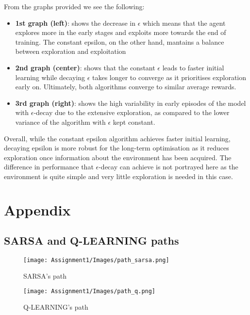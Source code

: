 \documentclass[11pt,a4paper]{article}
\begin{document}
From the graphs provided we see the following:
\begin{itemize}
    \item \textbf{1st graph (left)}: shows the decrease in $\epsilon$ which means that the agent explores more in the early stages and exploits more towards the end of training. The constant epsilon, on the other hand, mantains a balance between exploration and exploitation
    \item \textbf{2nd graph (center)}: shows that the constant $\epsilon$ leads to faster initial learning while decaying $\epsilon$ takes longer to converge as it prioritises exploration early on. Ultimately, both algorithms converge to similar average rewards.
    \item \textbf{3rd graph (right)}: shows the high variability in early episodes of the model with $\epsilon$-decay due to the extensive exploration, as compared to the lower variance of the algorithm with $\epsilon$ kept constant.
\end{itemize}

Overall, while the constant epsilon algorithm achieves faster initial learning, decaying epsilon is more robust for the long-term optimisation as it reduces exploration once information about the environment has been acquired. The difference in performance that $\epsilon$-decay can achieve is not portrayed here as the environment is quite simple and very little exploration is needed in this case.

\pagebreak


\section{Appendix}

\subsection{SARSA and Q-LEARNING paths}

\begin{figure}[h!]
    \centering
    \texttt{[image: Assignment1/Images/path\_sarsa.png]}
    \caption{SARSA's path}
    \label{fig:yourlabel}
\end{figure}

\begin{figure}[h!]
    \centering
    \texttt{[image: Assignment1/Images/path\_q.png]}
    \caption{Q-LEARNING's path}
    \label{fig:yourlabel}
\end{figure}
\end{document}
